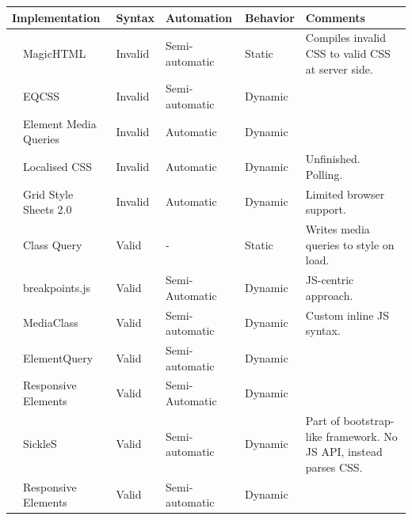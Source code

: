 \documentclass[a4paper,11pt]{kth-mag}
\begin{document}
      \begin{table}[ht]\center
        \tiny
        \begin{tabular}[t]{ l p{3cm} l l l p{3cm} }
          \multicolumn{2}{l}{Implementation} & Syntax & Automation & Behavior & Comments \\
          \hline
          \cite{eq_imp_magichtml} &             MagicHTML &                                   Invalid &   Semi-automatic &  Static &    Compiles invalid CSS to valid CSS at server side. \\
          \cite{eq_imp_eqcss} &                 EQCSS &                                       Invalid &   Semi-automatic &  Dynamic     \\
          \cite{eq_imp_prollyfill-min-width} &  Element Media Queries &                       Invalid &   Automatic &       Dynamic &   \\
          \cite{eq_imp_localised-css} &         Localised CSS &                               Invalid &   Automatic &       Dynamic &   Unfinished. Polling. \\
          \cite{eq_imp_gss} &                   Grid Style Sheets 2.0 &                       Invalid &   Automatic &       Dynamic &   Limited browser support. \\
          \cite{eq_imp_classquery} &            Class Query &                                 Valid &     - &               Static &    Writes media queries to style on load. \\
          \cite{eq_imp_breakpointsjs} &         breakpoints.js &                              Valid &     Semi-Automatic &  Dynamic &   JS-centric approach. \\
          \cite{eq_imp_mediaclass} &            MediaClass &                                  Valid &     Semi-automatic &  Dynamic &   Custom inline JS syntax. \\
          \cite{eq_imp_elementquery} &          ElementQuery &                                Valid &     Semi-automatic &  Dynamic &   \\
          \cite{eq_imp_responsive-elements} &   Responsive Elements &                         Valid &     Semi-Automatic &  Dynamic &   \\
          \cite{eq_imp_sickles} &               SickleS &                                     Valid &     Semi-automatic &  Dynamic &   Part of bootstrap-like framework. No JS API, instead parses CSS. \\
          \cite{eq_imp_responsive-elements-2} & Responsive Elements &                         Valid &     Semi-automatic &  Dynamic &   \\

\end{tabular}
\end{table}
\end{document}
